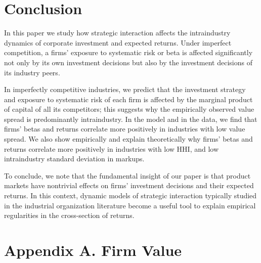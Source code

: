 \documentclass[nogrid,nosurname,sort&compress]{RFS}
\begin{document}

\section{Conclusion}\label{s4}

In this paper we study how strategic interaction affects the intraindustry dynamics of corporate
investment and expected returns. Under imperfect competition, a firms' exposure to systematic
risk or beta is affected significantly not only by its own investment decisions but also by the
investment decisions of its industry peers.

In imperfectly competitive industries, we predict that the investment strategy and exposure to
systematic risk of each firm is affected by the marginal product of capital of all its
competitors; this suggests why the empirically observed value spread is predominantly
intraindustry. In the model and in the data, we find that firms' betas and returns correlate
more positively in industries with low value spread. We also show empirically and explain
theoretically why firms' betas and returns correlate more positively in industries with low HHI,
and low intraindustry standard deviation in markups.

To conclude, we note that the fundamental insight of our paper is that product markets have
nontrivial effects on firms' investment decisions and their expected returns. In this context,
dynamic models of strategic interaction typically studied in the industrial organization
literature become a useful tool to explain empirical regularities in the cross-section of returns.

\appendix

\renewcommand{\thesection}{\Roman{section}}%
\renewcommand{\thesubsection}{\Alph{subsection}}%
\renewcommand{\thesubsubsection}{\Alph{subsection}.\arabic{subsubsection}.}%

\section*{Appendix A. Firm Value}\label{appendix: fval}
\end{document}
